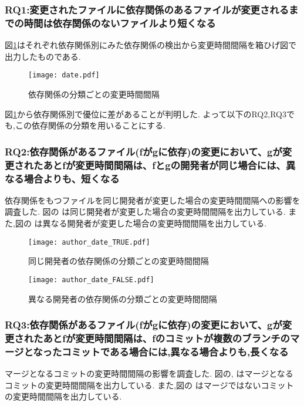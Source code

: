 \documentclass{fose2016}           %
\begin{document}
\subsubsection{RQ1:変更されたファイルに依存関係のあるファイルが変更されるまでの時間は依存関係のないファイルより短くなる}
図\ref{fig:subdate}はそれぞれ依存関係別にみた依存関係の検出から変更時間間隔を箱ひげ図で出力したものである.　　

\begin{figure}
\centering
\texttt{[image: date.pdf]}
\caption{依存関係の分類ごとの変更時間間隔}
\label{fig:subdate} 
\end{figure}




図\ref{fig:subdate}から依存関係別で優位に差があることが判明した.
よって以下のRQ2,RQ3でも,この依存関係の分類を用いることにする.


\subsubsection{RQ2:依存関係があるファイル(fがgに依存)の変更において、gが変更されたあとfが変更時間間隔は、fとgの開発者が同じ場合には、異なる場合よりも、短くなる}
依存関係をもつファイルを同じ開発者が変更した場合の変更時間間隔への影響を調査した.
図の\label{fig:author_true_subdate} は同じ開発者が変更した場合の変更時間間隔を出力している.
また,図の\label{fig:author_false_subdate} は異なる開発者が変更した場合の変更時間間隔を出力している.

\begin{figure}
\centering
\begin{minipage}{0.49\columnwidth}
\centering
\texttt{[image: author\_date\_TRUE.pdf]}
\caption{同じ開発者の依存関係の分類ごとの変更時間間隔}
\label{fig:author_true_subdate} 
\end{minipage}
\begin{minipage}{0.49\columnwidth}
\centering
\texttt{[image: author\_date\_FALSE.pdf]}
\caption{異なる開発者の依存関係の分類ごとの変更時間間隔}
\label{fig:author_false_subdate} 
\end{minipage}
\end{figure}


\subsubsection{RQ3:依存関係があるファイル(fがgに依存)の変更において、gが変更されたあとfが変更時間間隔は、fのコミットが複数のブランチのマージとなったコミットである場合には,異なる場合よりも,長くなる}
マージとなるコミットの変更時間間隔の影響を調査した.
図の,\label{fig:merge_true_subdate} はマージとなるコミットの変更時間間隔を出力している.
また,図の\label{fig:merge_false_subdate} はマージではないコミットの変更時間間隔を出力している.
\end{document}
